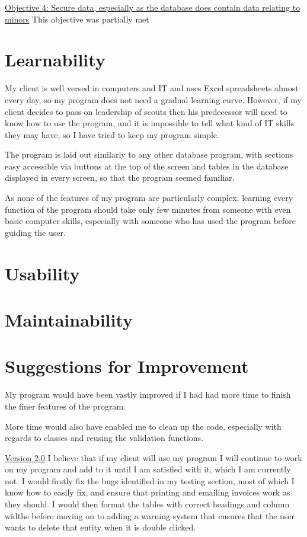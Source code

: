 \underline{Objective 4: Secure data, especially as the database does contain data relating to minors}
This objective was partially met


\section{Learnability}
My client is well versed in computers and IT and uses Excel spreadsheets almost every day, so my program does not need a gradual learning curve. However, if my client decides to pass on leadership of scouts then his predecessor will need to know how to use the program, and it is impossible to tell what kind of IT skills they may have, so I have tried to keep my program simple.

The program is laid out similarly to any other database program, with sections easy accessible via buttons at the top of the screen and tables in the database displayed in every screen, so that the program seemed familiar.

As none of the features of my program are particularly complex, learning every function of the program should take only few minutes from someone with even basic computer skills, especially with someone who has used the program before guiding the user.

\section{Usability}

\section{Maintainability}

\section{Suggestions for Improvement}
My program would have been vastly improved if I had had more time to finish the finer features of the program.

More time would also have enabled me to clean up the code, especially with regards to classes and reusing the validation functions.

\underline{Version 2.0}
I believe that if my client will use my program I will continue to work on my program and add to it until I am satisfied with it, which I am currently not. I would firstly fix the bugs identified in my testing section, most of which I know how to easily fix, and ensure that printing and emailing invoices work as they should. I would then format the tables with correct headings and column widths before moving on to adding a warning system that ensures that the user wants to delete that entity when it is double clicked. 

